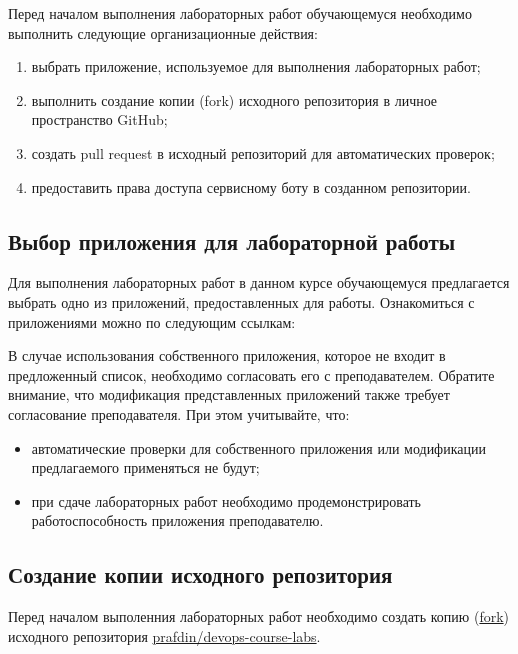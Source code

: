\documentclass[12pt,a4paper]{article}
\begin{document}
Перед началом выполнения лабораторных работ обучающемуся необходимо выполнить следующие организационные действия:
\begin{enumerate}
    \item выбрать приложение, используемое для выполнения лабораторных работ;
    \item выполнить создание копии (fork) исходного репозитория в личное пространство GitHub;
    \item создать pull request в исходный репозиторий для автоматических проверок;
    \item предоставить права доступа сервисному боту в созданном репозитории.
\end{enumerate}

\subsection{Выбор приложения для лабораторной работы}
Для выполнения лабораторных работ в данном курсе обучающемуся предлагается выбрать одно из приложений, предоставленных для работы.
Ознакомиться с приложениями можно по следующим ссылкам:
В случае использования собственного приложения, которое не входит в предложенный список, необходимо согласовать его с преподавателем.
Обратите внимание, что модификация представленных приложений также требует согласование преподавателя. При этом учитывайте, что:
\begin{itemize}
    \item автоматические проверки для собственного приложения или модификации предлагаемого применяться не будут;
    \item при сдаче лабораторных работ необходимо продемонстрировать работоспособность приложения преподавателю.
\end{itemize}

\subsection{Создание копии исходного репозитория}
Перед началом выполенния лабораторных работ необходимо создать копию (\href{https://docs.github.com/en/pull-requests/collaborating-with-pull-requests/working-with-forks/fork-a-repo}{fork}) исходного
репозитория \href{https://github.com/prafdin/devops-course-labs}{prafdin/devops-course-labs}.
\end{document}
